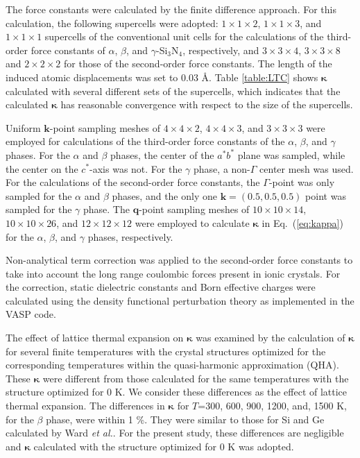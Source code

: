\documentclass[twocolumn,amsmath,amssymb,a4paper,prb,superscriptaddress,floatfix]{revtex4-1}
\begin{document}
The force constants were calculated by the finite difference
approach\cite{wei-supercell}. For this calculation, the following supercells
were adopted: $1\times 1\times2$, $1\times 1\times3$, and $1\times 1\times1$
supercells of the conventional unit cells for the calculations of the
third-order force constants of $\alpha$, $\beta$, and $\gamma$-Si$_3$N$_4$,
respectively, and $3\times 3\times4$, $3\times 3\times8$ and $2\times 2\times2$
for those of the second-order force constants.  The length of the induced atomic
displacements was set to 0.03 \AA.  Table \ref{table:LTC} shows
$\boldsymbol{\kappa}$ calculated with several different sets of the supercells,
which indicates that the calculated $\boldsymbol{\kappa}$ has reasonable
convergence with respect to the size of the supercells.

Uniform $\mathbf{k}$-point sampling meshes of $4\times 4\times 2$, $4\times
4\times 3$, and $3\times 3\times 3$ were employed for calculations of the
third-order force constants of the $\alpha$, $\beta$, and $\gamma$ phases. For
the $\alpha$ and $\beta$ phases, the center of the $a^*b^*$ plane was sampled,
while the center on the $c^*$-axis was not. For the $\gamma$ phase, a non-$\Gamma$
center mesh was used. For the calculations of the second-order force constants,
the $\Gamma$-point was only sampled for the $\alpha$ and $\beta$
phases, and the
only one $\mathbf{k}=(0.5, 0.5, 0.5)$ point was sampled for the $\gamma$ phase.
The $\mathbf{q}$-point sampling meshes of $10\times 10\times 14$, $10\times
10\times 26$, and $12\times 12\times 12$ were employed to calculate
$\boldsymbol{\kappa}$ in Eq.~(\ref{eq:kappa}) for the $\alpha$, $\beta$, and
$\gamma$ phases, respectively.

Non-analytical term correction\cite{wang} was applied to the second-order force
constants to take into account the long range coulombic forces present in ionic
crystals. For the correction, static dielectric constants and Born effective
charges were calculated using the density functional perturbation theory
as implemented in the VASP code\cite{vasp-lepsiron,lepsiron}.

The effect of lattice thermal expansion on $\boldsymbol{\kappa}$ was examined
by the calculation of $\boldsymbol{\kappa}$ for several finite
temperatures with the crystal structures optimized for the
corresponding temperatures within the quasi-harmonic approximation
(QHA)\cite{dove-p76}. These $\boldsymbol{\kappa}$ were different from those
calculated for the same temperatures with the structure
optimized for 0 K. We consider these differences as the effect of lattice
thermal expansion. The differences in $\boldsymbol{\kappa}$ for $T$=300, 600,
900, 1200, and, 1500 K, for the $\beta$ phase, were within 1 \%. They
were similar to those for Si and Ge calculated by Ward {\it{et
al.}}\cite{ward-ltc}.
For the present study, these differences are negligible and
$\boldsymbol{\kappa}$ calculated with the
structure optimized for 0 K was adopted.
\end{document}
